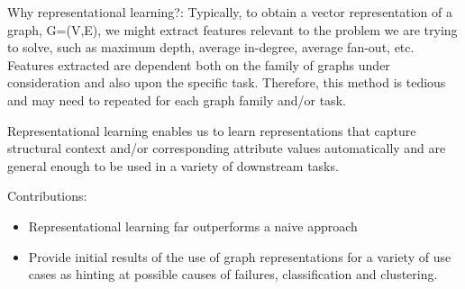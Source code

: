 Why representational learning?: \newline
Typically, to obtain a vector representation of a graph, G=(V,E), we might extract features relevant to the problem we are trying to solve, such as maximum depth, average in-degree, average fan-out, etc. Features extracted are dependent both on the family of graphs under consideration and also upon the specific task. Therefore, this method is tedious and may need to repeated for each graph family and/or task.

Representational learning enables us to learn representations that capture structural context and/or corresponding attribute values automatically and are general enough to be used in a variety of downstream tasks. \newline


Contributions:
\begin{itemize}
\item Representational learning far outperforms a naive approach 
\item Provide initial results of the use of graph representations for a variety of use cases as hinting at possible causes of failures, classification and clustering.
\end{itemize}
